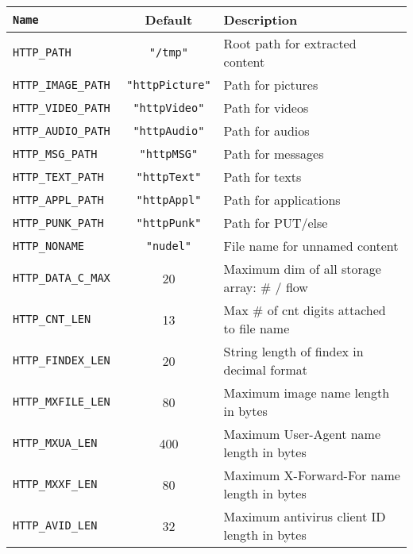 \documentclass[documentation]{subfiles}
\begin{document}
\begin{longtable}{>{\tt}lcl}
    \toprule
    {\bf Name}          & {\bf Default}             & {\bf Description} \\
    \midrule\endhead%
    HTTP\_PATH          & {\tt\small "/tmp"}        & Root path for extracted content \\
    HTTP\_IMAGE\_PATH   & {\tt\small "httpPicture"} & Path for pictures \\
    HTTP\_VIDEO\_PATH   & {\tt\small "httpVideo"}   & Path for videos \\
    HTTP\_AUDIO\_PATH   & {\tt\small "httpAudio"}   & Path for audios \\
    HTTP\_MSG\_PATH     & {\tt\small "httpMSG"}     & Path for messages \\
    HTTP\_TEXT\_PATH    & {\tt\small "httpText"}    & Path for texts \\
    HTTP\_APPL\_PATH    & {\tt\small "httpAppl"}    & Path for applications \\
    HTTP\_PUNK\_PATH    & {\tt\small "httpPunk"}    & Path for PUT/else \\
    HTTP\_NONAME        & {\tt\small "nudel"}       & File name for unnamed content \\
    HTTP\_DATA\_C\_MAX  &  20                       & Maximum dim of all storage array: \# / flow \\
    HTTP\_CNT\_LEN      &  13                       & Max \# of cnt digits attached to file name \\
    HTTP\_FINDEX\_LEN   &  20                       & String length of findex in decimal format \\
    HTTP\_MXFILE\_LEN   &  80                       & Maximum image name length in bytes \\
    HTTP\_MXUA\_LEN     & 400                       & Maximum User-Agent name length in bytes \\
    HTTP\_MXXF\_LEN     &  80                       & Maximum X-Forward-For name length in bytes \\
    HTTP\_AVID\_LEN     &  32                       & Maximum antivirus client ID length in bytes \\
    \bottomrule
\end{longtable}
\end{document}
